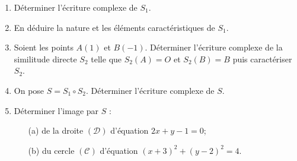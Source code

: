 \documentclass[12pt,a4paper]{article}
\begin{document}
\begin{enumerate}
    \item Déterminer l’écriture complexe de \( S_1 \).
    \item En déduire la nature et les éléments caractéristiques de \( S_1 \).
    \item Soient les points \( A(1) \) et \( B(-1) \). Déterminer l’écriture complexe de la similitude directe  
          \( S_2 \) telle que \( S_2(A) = O \) et \( S_2(B) = B \) puis caractériser \( S_2 \).
    \item On pose \( S = S_1 \circ S_2 \). Déterminer l’écriture complexe de \( S \).
    \item Déterminer l’image par \( S \) :
    \begin{enumerate}
        \item[(a)] de la droite \( (\mathscr{D}) \) d’équation \( 2x + y - 1 = 0 \);
        \item[(b)] du cercle \( (\mathscr{C}) \) d’équation \( (x + 3)^2 + (y - 2)^2 = 4 \).
    \end{enumerate}
\end{enumerate}
\end{document}
